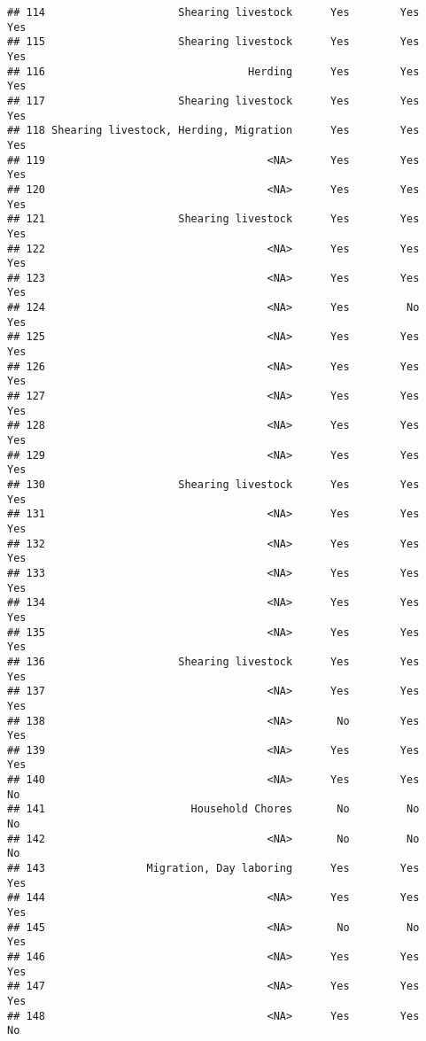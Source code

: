\documentclass[
]{article}
\begin{document}
\begin{verbatim}
## 114                     Shearing livestock      Yes        Yes      Yes
## 115                     Shearing livestock      Yes        Yes      Yes
## 116                                Herding      Yes        Yes      Yes
## 117                     Shearing livestock      Yes        Yes      Yes
## 118 Shearing livestock, Herding, Migration      Yes        Yes      Yes
## 119                                   <NA>      Yes        Yes      Yes
## 120                                   <NA>      Yes        Yes      Yes
## 121                     Shearing livestock      Yes        Yes      Yes
## 122                                   <NA>      Yes        Yes      Yes
## 123                                   <NA>      Yes        Yes      Yes
## 124                                   <NA>      Yes         No      Yes
## 125                                   <NA>      Yes        Yes      Yes
## 126                                   <NA>      Yes        Yes      Yes
## 127                                   <NA>      Yes        Yes      Yes
## 128                                   <NA>      Yes        Yes      Yes
## 129                                   <NA>      Yes        Yes      Yes
## 130                     Shearing livestock      Yes        Yes      Yes
## 131                                   <NA>      Yes        Yes      Yes
## 132                                   <NA>      Yes        Yes      Yes
## 133                                   <NA>      Yes        Yes      Yes
## 134                                   <NA>      Yes        Yes      Yes
## 135                                   <NA>      Yes        Yes      Yes
## 136                     Shearing livestock      Yes        Yes      Yes
## 137                                   <NA>      Yes        Yes      Yes
## 138                                   <NA>       No        Yes      Yes
## 139                                   <NA>      Yes        Yes      Yes
## 140                                   <NA>      Yes        Yes       No
## 141                       Household Chores       No         No       No
## 142                                   <NA>       No         No       No
## 143                Migration, Day laboring      Yes        Yes      Yes
## 144                                   <NA>      Yes        Yes      Yes
## 145                                   <NA>       No         No      Yes
## 146                                   <NA>      Yes        Yes      Yes
## 147                                   <NA>      Yes        Yes      Yes
## 148                                   <NA>      Yes        Yes       No

\end{verbatim}
\end{document}

